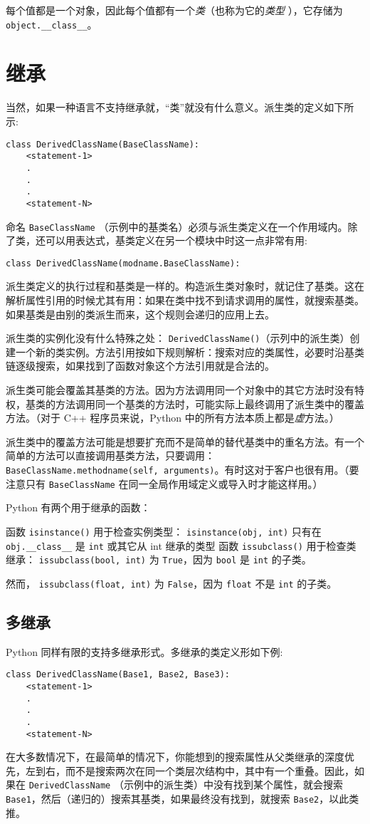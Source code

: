 每个值都是一个对象，因此每个值都有一个\textit{类}（也称为它的\textit{类型} ），它存储为\verb|object.__class__|。
\section{继承}
当然，如果一种语言不支持继承就，“类”就没有什么意义。派生类的定义如下所示:
\begin{lstlisting}
class DerivedClassName(BaseClassName):
    <statement-1>
    .
    .
    .
    <statement-N>
\end{lstlisting}
命名 \texttt{BaseClassName} （示例中的基类名）必须与派生类定义在一个作用域内。除了类，还可以用表达式，基类定义在另一个模块中时这一点非常有用:
\begin{lstlisting}
class DerivedClassName(modname.BaseClassName):
\end{lstlisting}
派生类定义的执行过程和基类是一样的。构造派生类对象时，就记住了基类。这在解析属性引用的时候尤其有用：如果在类中找不到请求调用的属性，就搜索基类。如果基类是由别的类派生而来，这个规则会递归的应用上去。

派生类的实例化没有什么特殊之处： \texttt{DerivedClassName()}（示列中的派生类）创建一个新的类实例。方法引用按如下规则解析：搜索对应的类属性，必要时沿基类链逐级搜索，如果找到了函数对象这个方法引用就是合法的。

派生类可能会覆盖其基类的方法。因为方法调用同一个对象中的其它方法时没有特权，基类的方法调用同一个基类的方法时，可能实际上最终调用了派生类中的覆盖方法。（对于 C++ 程序员来说，Python 中的所有方法本质上都是\textit{虚}方法。）

派生类中的覆盖方法可能是想要扩充而不是简单的替代基类中的重名方法。有一个简单的方法可以直接调用基类方法，只要调用： \texttt{BaseClassName.methodname(self, arguments)}。有时这对于客户也很有用。（要注意只有 \texttt{BaseClassName} 在同一全局作用域定义或导入时才能这样用。）

Python 有两个用于继承的函数：

函数 \texttt{isinstance()} 用于检查实例类型： \texttt{isinstance(obj, int)} 只有在 \cprotect\texttt{obj.\verb|__class__|} 是 \texttt{int} 或其它从 int 继承的类型
函数 \texttt{issubclass()} 用于检查类继承： \texttt{issubclass(bool, int)} 为 \texttt{True}，因为 \texttt{bool} 是 \texttt{int} 的子类。

然而， \texttt{issubclass(float, int)} 为 \texttt{False}，因为 \texttt{float} 不是 \texttt{int} 的子类。
\subsection{多继承}
Python 同样有限的支持多继承形式。多继承的类定义形如下例:
\begin{lstlisting}
class DerivedClassName(Base1, Base2, Base3):
    <statement-1>
    .
    .
    .
    <statement-N>
\end{lstlisting}
在大多数情况下，在最简单的情况下，你能想到的搜索属性从父类继承的深度优先，左到右，而不是搜索两次在同一个类层次结构中，其中有一个重叠。因此，如果在 \texttt{DerivedClassName} （示例中的派生类）中没有找到某个属性，就会搜索 \texttt{Base1}，然后（递归的）搜索其基类，如果最终没有找到，就搜索 \texttt{Base2}，以此类推。

